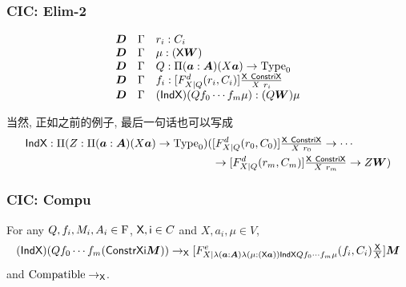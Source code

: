 \subsubsection*{CIC: Elim-2}
\[
  \begin{array}{lll}
    \bm D & \Gamma & r_i : C_i \\
    \bm D & \Gamma & \mu : (\cc X \bm W) \\
    \bm D & \Gamma & Q : \Pi(\bm a : \bm A)(X \bm a) \rightarrow \Type_0 \\
    \bm D & \Gamma & f_i : [F^d_{X| Q}(r_i, C_i)]\tfrac{\cc X \ \cc{ConstriX}}{X \ r_i}\\
    \bm D & \Gamma & (\cc{IndX}) (Q f_0 \cdots f_m\mu) : (Q \bm W) \mu
  \end{array}
\]

当然, 正如之前的例子, 最后一句话也可以写成
\begin{align*}
  \text{{\sffamily IndX}} : \Pi(Z :  \Pi(\boldsymbol{a} : \boldsymbol{A})(X \boldsymbol{a}) \rightarrow \mathrm{Type}_0 ) (&[F^d_{X| Q}(r_0, C_0)]\tfrac{\text{{\sffamily X}} \ \text{{\sffamily ConstriX}}}{X \ r_0} \rightarrow \cdots \\ 
  &\rightarrow [F^d_{X| Q}(r_m, C_m)]\tfrac{\text{{\sffamily X}} \ \text{{\sffamily ConstriX}}}{X \ r_m}  \rightarrow Z \boldsymbol{W})
\end{align*}


\subsubsection*{CIC: Compu}
\begin{definition}
  For any $Q, f_i, M_i, A_i \in \mathrm{F}$, $\text{{\sffamily X}}, \text{{\sffamily i}} \in C$ and $X, a_i, \mu \in V$,  
  \[
    (\text{{\sffamily IndX}})(Q f_0 \cdots f_m (\text{{\sffamily ConstrXi}} \boldsymbol{M})) \rightarrow_{\text{{\sffamily X}}} [F^e_{X|\lambda(\boldsymbol{a} : \boldsymbol{A}) \lambda (\mu : (\text{{\sffamily X}} \boldsymbol{a})) \text{{\sffamily IndX}} Q f_0 \cdots f_m \mu }(f_i, C_i)\tfrac{\text{{\sffamily X}}}{X}] \boldsymbol{M}
  \]
  and $\mathrm{Compatible}\rightarrow_{\text{{\sffamily X}}}$.  
\end{definition}

